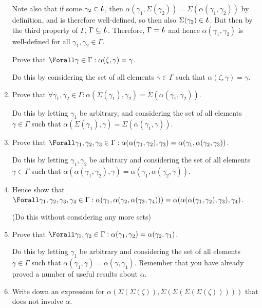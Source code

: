 \begin{enumerate}
\begin{tcolorbox}
   Note also that if some \(\gamma_2 \in \BigIota\), then
   \(\alpha(\gamma_1, \Sigma(\gamma_2)) = \Sigma(\alpha(\gamma_1, \gamma_2))\)
   by definition, and is therefore well-defined, so then also
   \(\Sigma(\gamma_2) \in \BigIota\). But then by the third property of
   \(\Gamma\), \(\Gamma \subseteq \BigIota\). Therefore, \(\Gamma = \BigIota\)
   and hence \(\alpha(\gamma_1, \gamma_2)\) is well-defined for all
   \(\gamma_1, \gamma_2 \in \Gamma\).
  \end{tcolorbox}
  Prove that \(\Forall \gamma \in \Gamma : \alpha(\zeta, \gamma) = \gamma\).

  Do this by considering the set of all elements \(\gamma \in \Gamma\) such that
  \(\alpha(\zeta, \gamma) = \gamma\).
 \item
  Prove that
  \(\forall \gamma_1, \gamma_2 \in \Gamma :
    \alpha(\Sigma(\gamma_1), \gamma_2) = \Sigma(\alpha(\gamma_1, \gamma_2))\).

  Do this by letting \(\gamma_1\) be arbitrary, and considering the set of all
  elements \(\gamma \in \Gamma\) such that
  \(\alpha(\Sigma(\gamma_1), \gamma) = \Sigma(\alpha(\gamma_1, \gamma))\).
 \item
  Prove that
  \(\Forall \gamma_1, \gamma_2, \gamma_3 \in \Gamma :
    \alpha(\alpha(\gamma_1, \gamma_2), \gamma_3) =
    \alpha(\gamma_1, \alpha(\gamma_2, \gamma_3))\).

  Do this by letting \(\gamma_1, \gamma_2\) be arbitrary and considering the set
  of all elements \(\gamma \in \Gamma\) such that
  \(\alpha(\alpha(\gamma_1, \gamma_2), \gamma) =
    \alpha(\gamma_1, \alpha(\gamma_2, \gamma))\).
 \item
  Hence show that
  \(\Forall \gamma_1, \gamma_2, \gamma_3, \gamma_4 \in \Gamma :
    \alpha(\gamma_1, \alpha(\gamma_2, \alpha(\gamma_3, \gamma_4))) =
    \alpha(\alpha(\alpha(\gamma_1, \gamma_2), \gamma_3), \gamma_4)\).

  (Do this without considering any more sets)
 \item
  Prove that
  \(\Forall \gamma_1, \gamma_2 \in \Gamma :
    \alpha(\gamma_1, \gamma_2) = \alpha(\gamma_2, \gamma_1)\).

  Do this by letting \(\gamma_1\) be arbitrary and considering the set of all
  elements \(\gamma \in \Gamma\) such that
  \(\alpha(\gamma_1, \gamma) = \alpha(\gamma, \gamma_1)\). Remember that you
  have already proved a number of useful results about \(\alpha\).
 \item
  Write down an expression for
  \(\alpha(\Sigma(\Sigma(\zeta)), \Sigma(\Sigma(\Sigma(\Sigma(\zeta)))))\) that
  does not involve \(\alpha\).


\end{enumerate}

